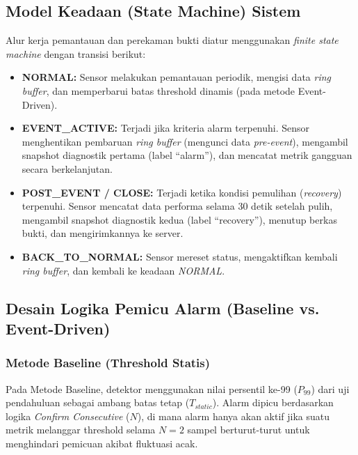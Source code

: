 \subsection{Model Keadaan (State Machine) Sistem}
Alur kerja pemantauan dan perekaman bukti diatur menggunakan \textit{finite state machine} dengan transisi berikut:
\begin{itemize}
    \item \textbf{NORMAL:} Sensor melakukan pemantauan periodik, mengisi data \textit{ring buffer}, dan memperbarui batas threshold dinamis (pada metode Event-Driven).
    \item \textbf{EVENT\_ACTIVE:} Terjadi jika kriteria alarm terpenuhi. Sensor menghentikan pembaruan \textit{ring buffer} (mengunci data \textit{pre-event}), mengambil snapshot diagnostik pertama (label ``alarm''), dan mencatat metrik gangguan secara berkelanjutan.
    \item \textbf{POST\_EVENT / CLOSE:} Terjadi ketika kondisi pemulihan (\textit{recovery}) terpenuhi. Sensor mencatat data performa selama 30 detik setelah pulih, mengambil snapshot diagnostik kedua (label ``recovery''), menutup berkas bukti, dan mengirimkannya ke server.
    \item \textbf{BACK\_TO\_NORMAL:} Sensor mereset status, mengaktifkan kembali \textit{ring buffer}, dan kembali ke keadaan \textit{NORMAL}.
\end{itemize}

\subsection{Desain Logika Pemicu Alarm (Baseline vs. Event-Driven)}

\subsubsection{Metode Baseline (Threshold Statis)}
Pada Metode Baseline, detektor menggunakan nilai persentil ke-99 ($P_{99}$) dari uji pendahuluan sebagai ambang batas tetap ($T_{static}$). Alarm dipicu berdasarkan logika \textit{Confirm Consecutive} ($N$), di mana alarm hanya akan aktif jika suatu metrik melanggar threshold selama $N = 2$ sampel berturut-turut untuk menghindari pemicuan akibat fluktuasi acak.

